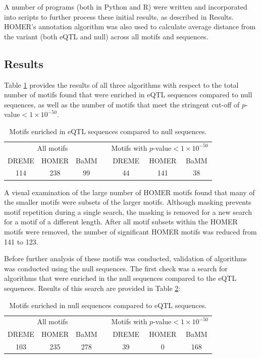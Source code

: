 \documentclass[12pt]{article}
\begin{document}
A number of programs (both in Python and R) were written and incorporated into scripts to further process these initial results, as described in Results. HOMER's annotation algorithm was also used to calculate average distance from the variant (both eQTL and null) across all motifs and sequences.

\subsection{Results}

Table \ref{eQTLmotifNumbers} provides the results of all three algorithms with respect to the total number of motifs found that were enriched in eQTL sequences compared to null sequences, as well as the number of motifs that meet the stringent cut-off of $p$-value$<1\times10^{-50}$.



\begin{table}[!htbp]
\caption{Motifs enriched in eQTL sequences compared to null sequences.}
\label{eQTLmotifNumbers}
\centering
\begin{tabular}{ccccccc}
\toprule[0.2em]
\multicolumn{3}{c}{All motifs} & & \multicolumn{3}{c}{Motifs with $p$-value$<1\times10^{-50}$}\\
\cmidrule[0.1em]{1-3}
\cmidrule[0.1em]{5-7}
DREME & HOMER & BaMM && DREME & HOMER & BaMM\\
114 & 238 & 99 && 44 & 141 & 38\\
\bottomrule[0.2em]
\end{tabular}
\end{table}

A visual examination of the large number of HOMER motifs found that many of the smaller motifs were subsets of the larger motifs. Although masking prevents motif repetition during a single search, the masking is removed for a new search for a motif of a different length. After all motif subsets within the HOMER motifs were removed, the number of significant HOMER motifs was reduced from 141 to 123.

Before further analysis of these motifs was conducted, validation of algorithms was conducted using the null sequences. The first check was a search for algorithms that were enriched in the null sequences compared to the eQTL sequences. Results of this search are provided in Table \ref{nullMotifNumbers}:

\begin{table}[!htbp]
\caption{Motifs enriched in null sequences compared to eQTL sequences.}
\label{nullMotifNumbers}
\centering
\begin{tabular}{ccccccc}
\toprule[0.2em]
\multicolumn{3}{c}{All motifs} & & \multicolumn{3}{c}{Motifs with $p$-value$<1\times10^{-50}$}\\
\cmidrule[0.1em]{1-3}
\cmidrule[0.1em]{5-7}
DREME & HOMER & BaMM && DREME & HOMER & BaMM\\
103 & 235 & 278 && 39 & 0 & 168\\
\bottomrule[0.2em]
\end{tabular}
\end{table}
\end{document}
